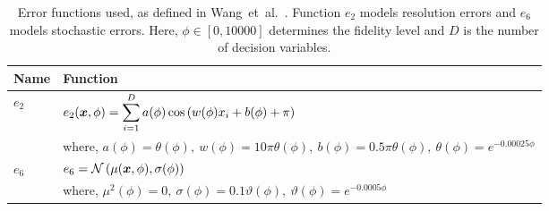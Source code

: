 \begin{table*}[h!]
\centering
\caption{Error functions used, as defined in Wang~et~al.~\cite{wang2017generic}. Function $e_2$ models resolution errors and $e_6$ models stochastic errors. Here, $\phi \in [0,10000]$ determines the fidelity level and $D$ is the number of decision variables.}\label{tab:errfuncs}
\begin{adjustbox}{width=0.7\textwidth}
{%
\begin{tabular}{ll} \toprule
Name & Function \\ \midrule
%
$e_2$         & $e_2(\boldsymbol{x},\phi) = \displaystyle\sum_{i=1}^{D}a(\phi)\cos{\left(w(\phi)x_i+b(\phi)+\pi\right)}$\\[0.3cm]
              & where, $a(\phi) = \theta(\phi),\ w(\phi) = 10\pi\theta(\phi),\ b(\phi) = 0.5\pi\theta(\phi),\ \theta(\phi) = e^{-0.00025\phi}$\\
\midrule
$e_6$         & $e_6 = \mathcal{N}\left(\mu(\boldsymbol{x},\phi),\sigma(\phi)\right)$ \\[0.3cm]
              & where, $\mu^2(\phi) = 0,\ \sigma(\phi) = 0.1\vartheta(\phi),\ \vartheta(\phi) = e^{-0.0005\phi}$\\
\bottomrule
\end{tabular}
}
\end{adjustbox}
\end{table*}
